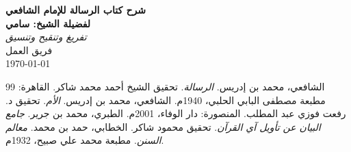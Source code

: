 \documentclass[12pt, a4paper]{book}
\begin{document}
\onehalfspacing

\begin{titlepage}
    \centering
    \vspace*{5cm}
    {\Huge \textbf{شرح كتاب الرسالة للإمام الشافعي}}\\[2cm]
    {\LARGE \textbf{لفضيلة الشيخ: سامي}}\\[3cm]
    {\Large \textit{تفريغ وتنقيح وتنسيق}}\\[1cm]
    {\large فريق العمل}\\[2cm]
    \vfill
    {\large \today}
\end{titlepage}

\frontmatter
\tableofcontents



\mainmatter



























\appendix


\backmatter

\renewcommand{\bibname}{قائمة المصادر والمراجع}
\begin{thebibliography}{99}
     الشافعي، محمد بن إدريس. \textit{الرسالة}. تحقيق الشيخ أحمد محمد شاكر. القاهرة: مطبعة مصطفى البابي الحلبي، 1940م.
     الشافعي، محمد بن إدريس. \textit{الأم}. تحقيق د. رفعت فوزي عبد المطلب. المنصورة: دار الوفاء، 2001م.
     الطبري، محمد بن جرير. \textit{جامع البيان عن تأويل آي القرآن}. تحقيق محمود شاكر.
     الخطابي، حمد بن محمد. \textit{معالم السنن}. مطبعة محمد علي صبيح، 1932م.
\end{thebibliography}

\printindex[quran]
\printindex[hadith]
\printindex[general]
\end{document}
